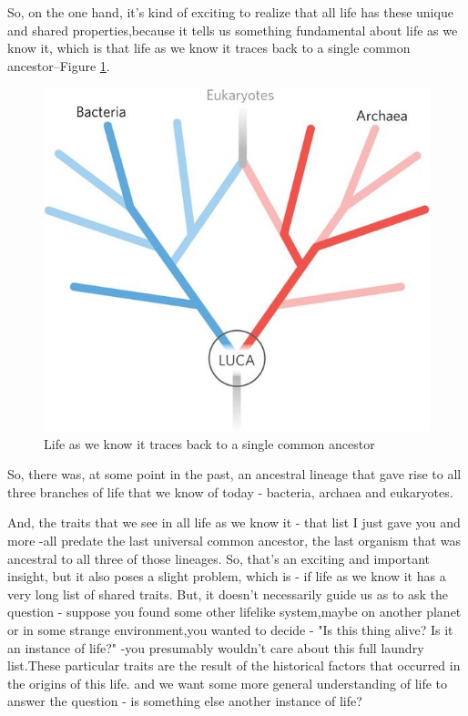 \documentclass[]{article}
\begin{document}
So, on the one hand, it's kind of exciting to realize that all life has these unique
and shared properties,because it tells us something fundamental about life as we know it,
which is that life as we know it traces back to a single common ancestor--Figure \ref{fig:LUCA_common}.
\begin{figure}[H]
	\caption{Life as we know it
		traces back to a single common ancestor}\label{fig:LUCA_common} 
	\includegraphics[width=\textwidth]{LUCA_common}
\end{figure}
So, there was, at some point in the past, an ancestral lineage that gave rise to
all three branches of life that we know of today - bacteria, archaea and eukaryotes.

And, the traits that we see in all life as we know it -
that list I just gave you and more -all predate the last universal
common ancestor,
the last organism that was ancestral
to all three of those lineages.
So, that's an exciting
and important insight,
but it also poses a slight problem,
which is -
if life as we know it
has a very long list of shared traits.
But, it doesn't necessarily guide us
as to ask the question - suppose you found
some other lifelike system,maybe on another planet
or in some strange environment,you wanted to decide -
"Is this thing alive? Is it an instance of life?" -you presumably wouldn't care about
this full laundry list.These particular traits are the result
of the historical factors that occurred in the origins of this life.
and we want some more general understanding of life
to answer the question - is something else
another instance of life?
\end{document}
